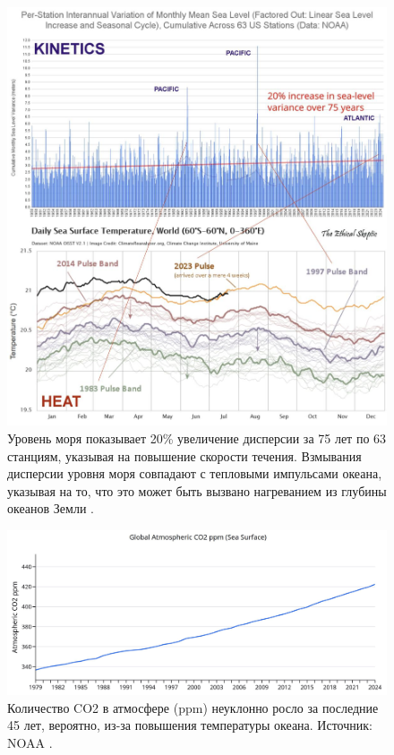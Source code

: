 \documentclass[10pt,twocolumn,letterpaper]{article}
\begin{document}
\begin{figure}[t]
\begin{center}
\includegraphics[width=1\textwidth]{sealevel.jpeg}
\end{center}
   \caption{Уровень моря показывает 20\% увеличение дисперсии за 75 лет по 63 станциям, указывая на повышение скорости течения. Взмывания дисперсии уровня моря совпадают с тепловыми импульсами океана, указывая на то, что это может быть вызвано нагреванием из глубины океанов Земли \cite{2,129}.}
\label{fig:22}
\end{figure}
\begin{figure}[t]
\begin{center}
\includegraphics[width=1\textwidth]{co2.jpg}
\end{center}
   \caption{Количество CO2 в атмосфере (ppm) неуклонно росло за последние 45 лет, вероятно, из-за повышения температуры океана. Источник: NOAA \cite{148,129}.}
\label{fig:23}
\end{figure}
\end{document}
